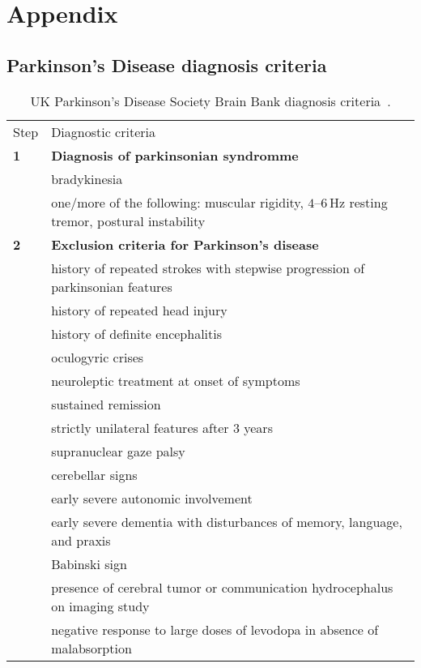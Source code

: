 \chapter{Appendix}
\section{Parkinson's Disease diagnosis criteria}

\begin{table*}[htb!]
	\caption{UK Parkinson's Disease Society Brain Bank diagnosis criteria~\cite{Hughes1992}.}
	\footnotesize
    \centering
	\label{tab:PD_clinical_diagnosis_criteria}

	\begin{tabular}{l l}
		\hline\hline\noalign{\smallskip}
		Step & Diagnostic criteria \\
		\noalign{\smallskip}\hline\noalign{\smallskip}
		\textbf{1} & \textbf{Diagnosis of parkinsonian syndromme} \\
		  & bradykinesia \\
		  & one/more of the following: muscular rigidity, $4$--$6$\,Hz resting tremor, postural instability \\
		\noalign{\smallskip}\hline\noalign{\smallskip}
		\textbf{2} & \textbf{Exclusion criteria for Parkinson's disease} \\
		  & history of repeated strokes with stepwise progression of parkinsonian features \\
		  & history of repeated head injury \\
		  & history of definite encephalitis \\
		  & oculogyric crises \\
		  & neuroleptic treatment at onset of symptoms \\
		  & sustained remission \\
		  & strictly unilateral features after 3 years \\
		  & supranuclear gaze palsy \\
		  & cerebellar signs \\
		  & early severe autonomic involvement \\
		  & early severe dementia with disturbances of memory, language, and praxis \\
		  & Babinski sign \\
		  & presence of cerebral tumor or communication hydrocephalus on imaging study \\
		  & negative response to large doses of levodopa in absence of malabsorption \\

\end{tabular}
\end{table*}
